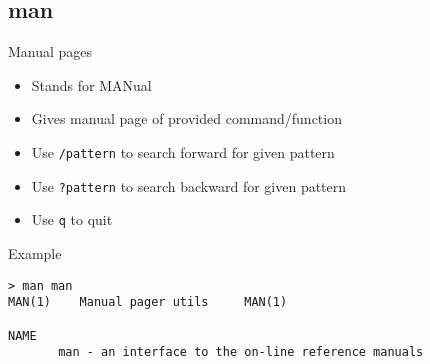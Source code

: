 \subsection{man}

\begin{frame}[fragile]{Manual pages}
  \begin{itemize}
    \pause \item Stands for MANual
    \pause \item Gives manual page of provided command/function
    \pause \item Use \texttt{/pattern} to search forward for given pattern
    \pause \item Use \texttt{?pattern} to search backward for given pattern
    \pause \item Use \texttt{q} to quit
  \end{itemize}
  \pause

  \begin{exampleblock}{Example}
    \begin{lstlisting}[showstringspaces=false,basicstyle=\tiny]
> man man
MAN(1)    Manual pager utils     MAN(1)

NAME
       man - an interface to the on-line reference manuals
    \end{lstlisting}
  \end{exampleblock}
\end{frame}

